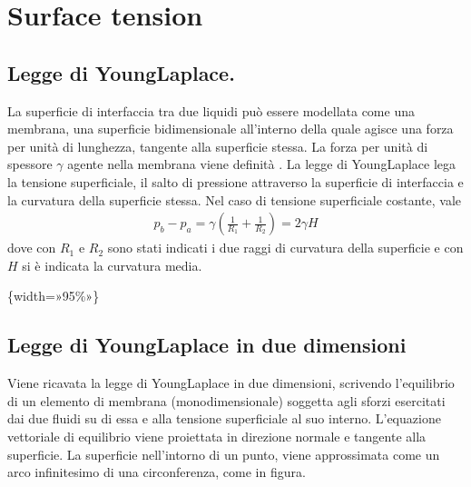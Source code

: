 \documentclass[letterpaper,10pt,italian]{jupyterBook}
\begin{document}
\sphinxstepscope


\chapter{Surface tension}
\label{\detokenize{polimi/fluidmechanics-ita/template/capitoli/02_tensSup/03teoria:surface-tension}}\label{\detokenize{polimi/fluidmechanics-ita/template/capitoli/02_tensSup/03teoria:fluid-mechanics-surface-tension}}\label{\detokenize{polimi/fluidmechanics-ita/template/capitoli/02_tensSup/03teoria::doc}}

\section{Legge di Young\sphinxhyphen{}Laplace.}
\label{\detokenize{polimi/fluidmechanics-ita/template/capitoli/02_tensSup/03teoria:legge-di-young-laplace}}\label{\detokenize{polimi/fluidmechanics-ita/template/capitoli/02_tensSup/03teoria:fluid-mechanics-surface-tension-young-laplace}}
\sphinxAtStartPar
La superficie di interfaccia tra due liquidi può essere modellata come
una membrana, una superficie bidimensionale all’interno della quale
agisce una forza per unità di lunghezza, tangente alla superficie
stessa. La forza per unità di spessore \(\gamma\) agente nella membrana
viene definità . La legge di Young\sphinxhyphen{}Laplace lega
la tensione superficiale, il salto di pressione attraverso la superficie
di interfaccia e la curvatura della superficie stessa. Nel caso di
tensione superficiale costante, vale
\begin{equation*}
\begin{split}p_b - p_a = \gamma \displaystyle\left( \frac{1}{R_1} + \frac{1}{R_2} \right) = 2 \gamma H\end{split}
\end{equation*}
\sphinxAtStartPar
dove con \(R_1\) e \(R_2\) sono stati indicati i due raggi di curvatura
della superficie e con \(H\) si è indicata la curvatura media.

\sphinxAtStartPar
{}\{width=»95\%»\}


\section{Legge di Young\sphinxhyphen{}Laplace in due dimensioni}
\label{\detokenize{polimi/fluidmechanics-ita/template/capitoli/02_tensSup/03teoria:legge-di-young-laplace-in-due-dimensioni}}\label{\detokenize{polimi/fluidmechanics-ita/template/capitoli/02_tensSup/03teoria:fluid-mechanics-surface-tension-young-laplace-2d}}
\sphinxAtStartPar
Viene ricavata la legge di Young\sphinxhyphen{}Laplace in due dimensioni, scrivendo
l’equilibrio di un elemento di membrana (monodimensionale) soggetta agli
sforzi esercitati dai due fluidi su di essa e alla tensione superficiale
al suo interno. L’equazione vettoriale di equilibrio viene proiettata in
direzione normale e tangente alla superficie. La superficie nell’intorno
di un punto, viene approssimata come un arco infinitesimo di una
circonferenza, come in figura.
\end{document}

